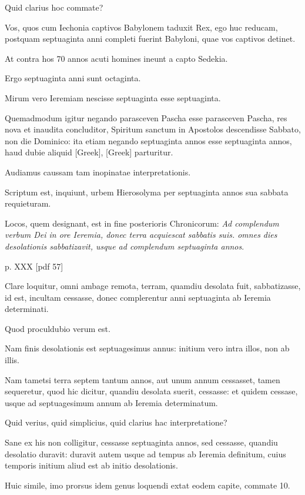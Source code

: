 \begin{parnumbers}
Quid clarius hoc commate?

Vos,
quos cum Iechonia captivos Babylonem taduxit Rex, ego huc
reducam, postquam septuaginta anni completi fuerint Babyloni,
quae vos captivos detinet.

At contra hos 70 annos acuti homines
ineunt a capto Sedekia.

Ergo septuaginta anni sunt octaginta.

Mirum vero Ieremiam nescisse septuaginta esse septuaginta.

Quemadmodum
igitur negando parasceven Pascha esse parasceven
Pascha, res nova et inaudita concluditor, Spiritum sanctum in 
Apostolos descendisse Sabbato, non die Dominico: ita etiam
negando septuaginta annos esse septuaginta annos, haud dubie
aliquid \textgreek{[Greek]}, \textgreek{[Greek]} parturitur.

Audiamus
caussam tam inopinatae interpretationis.

Scriptum est, inquiunt, urbem
Hierosolyma per septuaginta annos sua sabbata requieturam.

Locos, quem designant, est in fine posterioris Chronicorum:
\textit{Ad complendum verbum Dei in ore Ieremia,
 donec terra acquiescat sabbatis
suis. omnes dies desolationis sabbatizavit, usque ad complendum
septuaginta annos}.

\clearpage
p. XXX [pdf 57]

Clare loquitur, omni ambage remota, terram,
quamdiu desolata fuit, sabbatizasse, id est, incultam cessasse, donec
complerentur anni septuaginta ab Ieremia determinati.

Quod
proculdubio verum est.

Nam finis desolationis est septuagesimus
annus: initium vero intra illos, non ab illis.

Nam tametsi terra septem
tantum annos, aut unum annum cessasset, tamen sequeretur,
quod hic dicitur, quandiu desolata suerit, cessasse: et quidem cessase,
usque ad septuagesimum annum ab Ieremia determinatum.

Quid verius, quid simplicius, quid clarius hac interpretatione?

Sane
ex his non colligitur, cessasse septuaginta annos, sed cessasse,
quandiu desolatio duravit: duravit autem usque ad tempus ab Ieremia
definitum, cuius temporis initium aliud est ab initio desolationis.

Huic simile, imo prorsus idem genus loquendi extat eodem capite,
commate 10.


\end{parnumbers}
